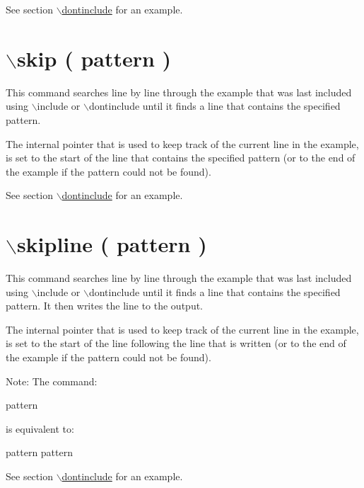 See section \hyperlink{commands_cmddontinclude}{$\backslash$dontinclude} for an example.



 \hypertarget{commands_cmdskip}{}\section{$\backslash$skip ( pattern )}\label{commands_cmdskip}
 This command searches line by line through the example that was last included using $\backslash$include or $\backslash$dontinclude until it finds a line that contains the specified pattern.

The internal pointer that is used to keep track of the current line in the example, is set to the start of the line that contains the specified pattern (or to the end of the example if the pattern could not be found).

See section \hyperlink{commands_cmddontinclude}{$\backslash$dontinclude} for an example.



 \hypertarget{commands_cmdskipline}{}\section{$\backslash$skipline ( pattern )}\label{commands_cmdskipline}
 This command searches line by line through the example that was last included using $\backslash$include or $\backslash$dontinclude until it finds a line that contains the specified pattern. It then writes the line to the output.

The internal pointer that is used to keep track of the current line in the example, is set to the start of the line following the line that is written (or to the end of the example if the pattern could not be found).

\begin{DoxyParagraph}{Note:}
The command: \begin{DoxyVerb}\skipline pattern\end{DoxyVerb}
 is equivalent to: \begin{DoxyVerb}
\skip pattern
\line pattern\end{DoxyVerb}

\end{DoxyParagraph}
See section \hyperlink{commands_cmddontinclude}{$\backslash$dontinclude} for an example.



